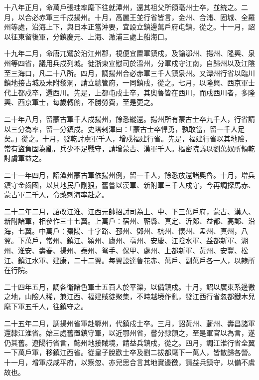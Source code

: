 \begin{pinyinscope}
 十八年正月，命萬戶張珪率麾下往就潭州，還其祖父所領亳州士卒，並統之。二月，以合必赤軍三千戍揚州。十月，高麗王並行省皆言，金州、合浦、固城、全羅州等處，沿海上下，與日本正當沖要，宜設立鎮邊萬戶府屯鎮，從之。十一月，詔以征東留後軍，分鎮慶元、上海、澉浦三處上船海口。



 十九年二月，命唐兀鷿於沿江州郡，視便宜置軍鎮戍，及諭鄂州、揚州、隆興、泉州等四省，議用兵戍列城。徙浙東宣慰司於溫州，分軍戍守江南，自歸州以及江陰至三海口，凡二十八所。四月，調揚州合必赤軍三千人鎮泉州。又潭州行省以臨川鎮地接占城及未附黎洞，請立總管府，一同鎮戍，從之。七月，以隆興、西京軍士代上都戍卒，還西川。先是，上都屯戍士卒，其奧魯皆在西川，而戍西川者，多隆興、西京軍士，每歲轉餉，不勝勞費，至是更之。



 二十年八月，留蒙古軍千人戍揚州，餘悉縱還。揚州所有蒙古士卒九千人，行省請以三分為率，留一分鎮戍。史塔剌渾曰：「蒙古士卒悍勇，孰敢當，留一千人足矣。」從之。十月，發乾討虜軍千人，增戍福建行省。先是，福建行省以其地險，常有盜負固為亂，兵少不足戰守，請增蒙古、漢軍千人。樞密院議以劉萬奴所領乾討虜軍益之。



 二十一年四月，詔潭州蒙古軍依揚州例，留一千人，餘悉放還諸奧魯。十月，增兵鎮守金齒國，以其地民戶剛狠，舊嘗以漢軍、新附軍三千人戍守，今再調探馬赤、蒙古軍二千人，令藥剌海率赴之。



 二十二年二月，詔改江淮、江西元帥招討司為上、中、下三萬戶府，蒙古、漢人、新附諸軍，相參作三十七翼。上萬戶：宿州、蘄縣、真定、沂郯、益都、高郵、沿海，七翼。中萬戶：棗陽、十字路、邳州、鄧州、杭州、懷州、孟州、真州，八翼。下萬戶，常州、鎮江、潁州、廬州、亳州、安慶、江陰水軍、益都新軍、湖州、淮安、壽春、揚州、泰州、弩手、保甲、處州、上都新軍、黃州、安豐、松江、鎮江水軍、建康，二十二翼。每翼設達魯花赤、萬戶、副萬戶各一人，以隸所在行院。



 二十四年五月，調各衛諸色軍士五百人於平灤，以備鎮戍。十月，詔以廣東系邊徼之地，山險人稀，兼江西、福建賊徒聚集，不時越境作亂，發江西行省忽都鐵木兒麾下軍五千人，往鎮守之。



 二十五年二月，調揚州省軍赴鄂州，代鎮戍士卒。三月，詔黃州、蘄州、壽昌諸軍還隸江淮省。始三處舊置鎮守軍，以近鄂州省，嘗分隸領之，至是軍官以為言，遂仍其舊。遼陽行省言，懿州地接賊境，請益兵鎮戍，從之。四月，調江淮行省全翼一下萬戶軍，移鎮江西省。從皇子脫歡士卒及劉二拔都麾下一萬人，皆散歸各營。十一月，增軍戍咸平府，以察忽、亦兒思合言其地實邊徼，請益兵鎮守，以備不虞故也。




\end{pinyinscope}
